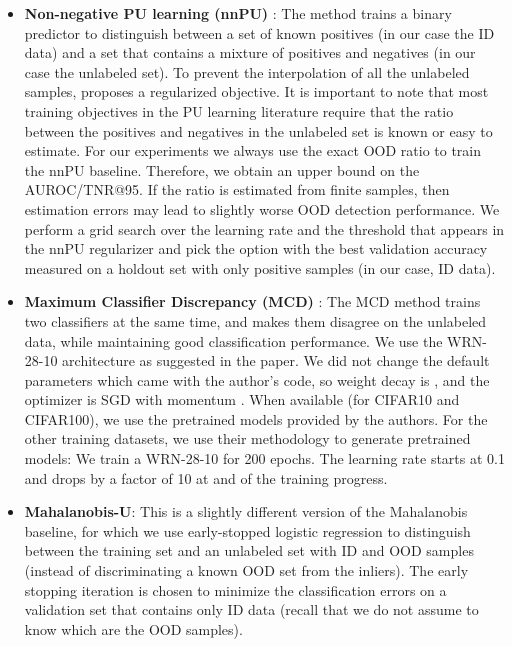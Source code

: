 \begin{itemize}

  \item \textbf{Non-negative PU learning (nnPU)} \citep{Kiryo17}: The method
    trains a binary predictor to distinguish between a set of known positives
    (in our case the ID data) and a set that contains a mixture of positives and
    negatives (in our case the unlabeled set). To prevent the interpolation of
    all the unlabeled samples, \citet{Kiryo17} proposes a regularized objective.
    It is important to note that most training objectives in the PU learning
    literature require that the ratio between the positives and negatives in the
    unlabeled set is known or easy to estimate. For our experiments we always
    use the exact OOD ratio to train the nnPU baseline. Therefore, we obtain an
    upper bound on the AUROC/TNR@95. If the ratio is estimated from finite
    samples, then estimation errors may lead to slightly worse OOD detection
    performance. We perform a grid search over the learning rate and the
    threshold that appears in the nnPU regularizer and pick the option with the
    best validation accuracy measured on a holdout set with only positive
    samples (in our case, ID data). 


  \item \textbf{Maximum Classifier Discrepancy (MCD)} \citep{mcd_ood}: The MCD
    method trains two classifiers at the same time, and makes them disagree on
    the unlabeled data, while maintaining good classification performance.  We
    use the WRN-28-10 architecture as suggested in the paper.  We did not change
    the default parameters which came with the author's code, so weight decay is
    , and the optimizer is SGD with momentum .  When available
    (for CIFAR10 and CIFAR100), we use the pretrained models provided by the
    authors. For the other training datasets, we use their methodology to
    generate pretrained models: We train a WRN-28-10 for 200 epochs.  The
    learning rate starts at 0.1 and drops by a factor of 10 at  and 
    of the training progress.

  \item \textbf{Mahalanobis-U}: This is a slightly different version of the
    Mahalanobis baseline, for which we use early-stopped logistic regression to
    distinguish between the training set and an unlabeled set with ID and OOD
    samples (instead of discriminating a known OOD set from the inliers). The
    early stopping iteration is chosen to minimize the classification errors on
    a validation set that contains only ID data (recall that we do not assume to
    know which are the OOD samples).

\end{itemize}

